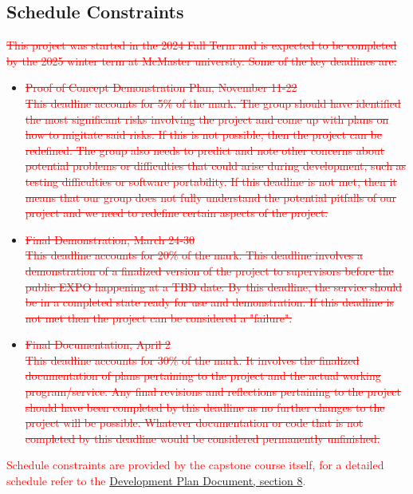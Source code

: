 \documentclass[12pt]{article}
\begin{document}
\subsection{Schedule Constraints}
\textcolor{red}{\sout{This project was started in the 2024 Fall Term and is expected to be completed by the 
2025 winter term at McMaster university. Some of the key deadlines are: }}
\begin{itemize}
  \item \textcolor{red}{\sout{Proof of Concept Demonstration Plan, November 11-22
  \\This deadline accounts for 5\% of the mark. The group should have identified the most significant
  risks involving the project and come up with plans on how to migitate said risks. If this is not possible, then the project 
  can be redefined. The group also needs to predict and note other concerns about potential problems or difficulties that could arise
  during development, such as testing difficulties or software portability. If this deadline is not met, then it means that our group
   does not fully understand the potential pitfalls of our project and we need to redefine certain aspects of the project. }}

  \item \textcolor{red}{\sout{Final Demonstration, March 24-30
  \\This deadline accounts for 20\% of the mark. This deadline involves a demonstration of a finalized 
  version of the project to supervisors before the public EXPO happening at a TBD date. By this deadline, 
  the service should be in a completed state ready for use and demonstration. If this deadline is not met then
  the project can be considered a "failure". }}

  \item \textcolor{red}{\sout{Final Documentation, April 2
  \\This deadline accounts for 30\% of the mark. It involves the finalized documentation of plans pertaining to 
  the project and the actual working program/service. Any final revisions and reflections pertaining to the project
  should have been completed by this deadline as no further changes to the project will be possible. Whatever documentation
  or code that is not completed by this deadline would be considered permanently unfinished. }}
\end{itemize}
\textcolor{red}{Schedule constraints are provided by the capstone course itself, for a detailed
schedule refer to the \href{https://github.com/AhmedAl-Hayali/GenreGuru/blob/main/docs/DevelopmentPlan/DevelopmentPlan.pdf}{Development Plan Document, section 8}.}
\end{document}
